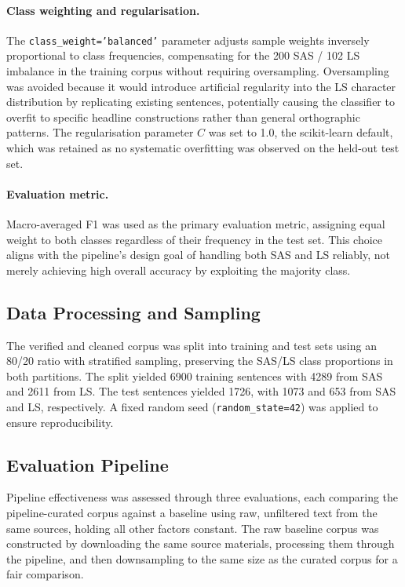 \documentclass[12pt]{ThesisRU}
\begin{document}
\paragraph{Class weighting and regularisation.}
The \texttt{class\_weight='balanced'} parameter adjusts sample
weights inversely proportional to class frequencies, compensating
for the 200 SAS / 102 LS imbalance in the training corpus without
requiring oversampling. Oversampling was avoided because it would
introduce artificial regularity into the LS character distribution
by replicating existing sentences, potentially causing the
classifier to overfit to specific headline constructions rather
than general orthographic patterns. The regularisation parameter
$C$ was set to 1.0, the scikit-learn default, which was retained
as no systematic overfitting was observed on the held-out test
set.

\paragraph{Evaluation metric.}
Macro-averaged F1 was used as the primary evaluation metric,
assigning equal weight to both classes regardless of their
frequency in the test set. This choice aligns with the pipeline's
design goal of handling both SAS and LS reliably, not merely
achieving high overall accuracy by exploiting the majority class.


\subsection{Data Processing and Sampling }

The verified and cleaned corpus was split into training and test
sets using an 80/20 ratio with stratified sampling, preserving the
SAS/LS class proportions in both partitions. The split yielded 6900 training sentences with 4289 from SAS and 2611 from LS. The test sentences yielded 1726, with 1073 and 653 from SAS and LS, respectively.
A fixed random seed (\texttt{random\_state=42}) was applied to ensure reproducibility.

\subsection{Evaluation Pipeline}
\label{sec:eval}

Pipeline effectiveness was assessed through three evaluations, each comparing the pipeline-curated corpus against a baseline using raw, unfiltered text from the same sources, holding all other factors constant. The raw baseline corpus was constructed by downloading the same source materials, processing them through the pipeline, and then downsampling to the same size as the curated corpus for a fair comparison.
\end{document}
